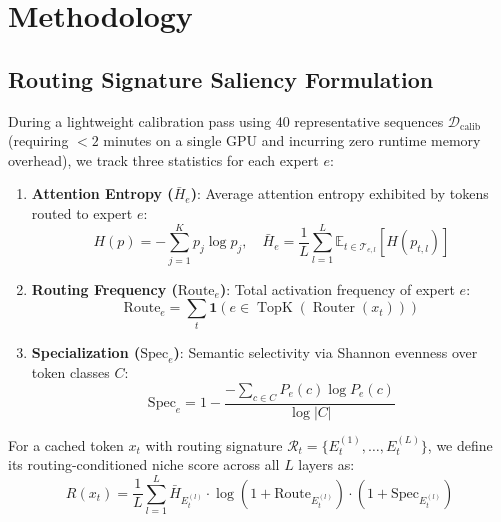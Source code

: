 \documentclass[runningheads]{llncs}
\begin{document}
\section{Methodology}

\subsection{Routing Signature Saliency Formulation}
During a lightweight calibration pass using 40 representative sequences $\mathcal{D}_{\text{calib}}$ (requiring $<2$ minutes on a single GPU and incurring zero runtime memory overhead), we track three statistics for each expert $e$:
\begin{enumerate}
    \item \textbf{Attention Entropy ($\bar{H}_e$)}: Average attention entropy exhibited by tokens routed to expert $e$:
    \begin{equation}
        H(p) = -\sum_{j=1}^{K} p_j \log p_j, \quad \bar{H}_e = \frac{1}{L} \sum_{l=1}^{L} \mathbb{E}_{t \in \mathcal{T}_{e,l}} [H(p_{t,l})]
    \end{equation}
    \item \textbf{Routing Frequency ($\text{Route}_e$)}: Total activation frequency of expert $e$:
    \begin{equation}
        \text{Route}_e = \sum_{t} \mathbf{1}(e \in \operatorname{TopK}(\operatorname{Router}(x_t)))
    \end{equation}
    \item \textbf{Specialization ($\text{Spec}_e$)}: Semantic selectivity via Shannon evenness over token classes $C$:
    \begin{equation}
        \text{Spec}_e = 1 - \frac{-\sum_{c \in C} P_e(c) \log P_e(c)}{\log |C|}
    \end{equation}
\end{enumerate}

For a cached token $x_t$ with routing signature $\mathcal{R}_t = \{E_t^{(1)}, \dots, E_t^{(L)}\}$, we define its routing-conditioned niche score across all $L$ layers as:
\begin{equation}
    R(x_t) = \frac{1}{L}\sum_{l=1}^{L} \bar{H}_{E_t^{(l)}} \cdot \log(1 + \text{Route}_{E_t^{(l)}}) \cdot (1 + \text{Spec}_{E_t^{(l)}})
    \label{eq:routing_score}
\end{equation}
\end{document}
